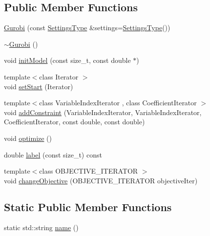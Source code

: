 \subsection*{Public Member Functions}
\begin{DoxyCompactItemize}
\item 
\hyperlink{classnifty_1_1ilp__backend_1_1Gurobi_ad1fe3b5d2314c16f2a334d13e7abda8f}{Gurobi} (const \hyperlink{classnifty_1_1ilp__backend_1_1Gurobi_a452f0f9dbcdf6bf9741607e9561fa3c5}{Settings\+Type} \&settings=\hyperlink{classnifty_1_1ilp__backend_1_1Gurobi_a452f0f9dbcdf6bf9741607e9561fa3c5}{Settings\+Type}())
\item 
\hyperlink{classnifty_1_1ilp__backend_1_1Gurobi_ab8e373ce16adba177e9341a2d0e55157}{$\sim$\+Gurobi} ()
\item 
void \hyperlink{classnifty_1_1ilp__backend_1_1Gurobi_ac4ee3e8981df207094a6580f07f2685d}{init\+Model} (const size\+\_\+t, const double $\ast$)
\item 
{\footnotesize template$<$class Iterator $>$ }\\void \hyperlink{classnifty_1_1ilp__backend_1_1Gurobi_a0875ce6a8a39917a496ec650c68da6a0}{set\+Start} (Iterator)
\item 
{\footnotesize template$<$class Variable\+Index\+Iterator , class Coefficient\+Iterator $>$ }\\void \hyperlink{classnifty_1_1ilp__backend_1_1Gurobi_ad4e3fa2d4f5fe726a46d40857c36a918}{add\+Constraint} (Variable\+Index\+Iterator, Variable\+Index\+Iterator, Coefficient\+Iterator, const double, const double)
\item 
void \hyperlink{classnifty_1_1ilp__backend_1_1Gurobi_a2521e51c0cdfb1e029d332ab7f203021}{optimize} ()
\item 
double \hyperlink{classnifty_1_1ilp__backend_1_1Gurobi_afbdf38456bb7ce8110168dd3aa7f691f}{label} (const size\+\_\+t) const 
\item 
{\footnotesize template$<$class O\+B\+J\+E\+C\+T\+I\+V\+E\+\_\+\+I\+T\+E\+R\+A\+T\+O\+R $>$ }\\void \hyperlink{classnifty_1_1ilp__backend_1_1Gurobi_a138de39ce46740b4728b9d2e7f8bd27b}{change\+Objective} (O\+B\+J\+E\+C\+T\+I\+V\+E\+\_\+\+I\+T\+E\+R\+A\+T\+O\+R objective\+Iter)
\end{DoxyCompactItemize}
\subsection*{Static Public Member Functions}
\begin{DoxyCompactItemize}
\item 
static std\+::string \hyperlink{classnifty_1_1ilp__backend_1_1Gurobi_a3c80f9769e9f33482397305e234b0aa7}{name} ()
\end{DoxyCompactItemize}


